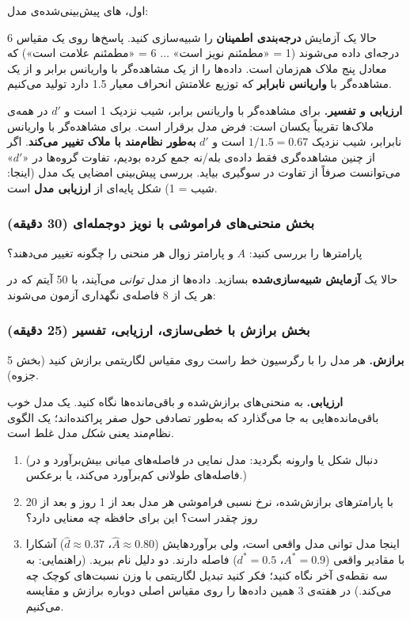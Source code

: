 اول، های پیش‌بینی‌شده‌ی مدل:

حالا یک آزمایش \textbf{درجه‌بندی اطمینان} را شبیه‌سازی کنید. پاسخ‌ها روی یک
مقیاس 6 درجه‌ای داده می‌شوند (1 = «مطمئنم نویز است» \ensuremath{\ldots} 6 = «مطمئنم
علامت است») که معادل پنج ملاک هم‌زمان است. داده‌ها را از یک مشاهده‌گر با
واریانس برابر و از یک مشاهده‌گر با \textbf{واریانس نابرابر} که توزیع
علامتش انحراف معیار 1.5 دارد تولید می‌کنیم.

\textbf{ارزیابی و تفسیر.} برای مشاهده‌گر با واریانس برابر، شیب 
نزدیک 1 است و \(d'\) در همه‌ی ملاک‌ها تقریباً یکسان است: فرض مدل برقرار
است. برای مشاهده‌گر با واریانس نابرابر، شیب نزدیک \(1/1.5 = 0.67\) است و
\(d'\) \textbf{به‌طور نظام‌مند با ملاک تغییر می‌کند}. اگر از چنین مشاهده‌گری
فقط داده‌ی بله/نه جمع کرده بودیم، تفاوت گروه‌ها در «\(d'\)» می‌توانست صرفاً
از تفاوت در سوگیری بیاید. بررسی پیش‌بینی امضایی یک مدل (اینجا: شیب
 = 1) شکل پایه‌ای از \textbf{ارزیابی مدل} است.

\subsubsection{\texorpdfstring{بخش  منحنی‌های فراموشی با نویز
دوجمله‌ای (30
دقیقه)}{بخش C: منحنی‌های فراموشی با نویز دوجمله‌ای (30 دقیقه)}}

پارامترها را بررسی کنید: \(A\) و پارامتر زوال هر منحنی را چگونه تغییر
می‌دهند؟

حالا یک \textbf{آزمایش شبیه‌سازی‌شده} بسازید. داده‌ها از مدل \emph{توانی}
می‌آیند، با 50 آیتم که در هر یک از 8 فاصله‌ی نگهداری آزمون می‌شوند:

\subsubsection{\texorpdfstring{بخش  برازش با خطی‌سازی، ارزیابی،
تفسیر (25 دقیقه)}{بخش D: برازش با خطی‌سازی، ارزیابی، تفسیر (25 دقیقه)}}

\textbf{برازش.} هر مدل را با رگرسیون خط راست روی مقیاس لگاریتمی برازش
کنید (بخش 5 جزوه).

\textbf{ارزیابی.} به منحنی‌های برازش‌شده \emph{و} باقی‌مانده‌ها نگاه کنید.
یک مدل خوب باقی‌مانده‌هایی به جا می‌گذارد که به‌طور تصادفی حول صفر
پراکنده‌اند؛ یک الگوی نظام‌مند یعنی \emph{شکل} مدل غلط است.

\begin{enumerate}
\def\labelenumi{\arabic{enumi}.}
\tightlist
\item
  (دنبال شکل  یا  وارونه بگردید: مدل نمایی در فاصله‌های میانی
  بیش‌برآورد و در فاصله‌های طولانی کم‌برآورد می‌کند، یا برعکس.)
\item
  با پارامترهای برازش‌شده، نرخ نسبی فراموشی هر مدل بعد از 1 روز و بعد از
  20 روز چقدر است؟ این برای حافظه چه معنایی دارد؟
\item
  اینجا مدل توانی مدل واقعی است، ولی برآوردهایش
  (\(\hat A \approx 0.80\)، \(\hat d \approx 0.37\)) آشکارا با مقادیر
  واقعی (\(A^\ast = 0.9\)، \(d^\ast = 0.5\)) فاصله دارند. دو دلیل نام
  ببرید. (راهنمایی: به سه نقطه‌ی آخر نگاه کنید؛ فکر کنید تبدیل لگاریتمی
  با وزن نسبت‌های کوچک چه می‌کند.) در هفته‌ی 3 همین داده‌ها را روی مقیاس
  اصلی دوباره برازش و مقایسه می‌کنیم.
\end{enumerate}

